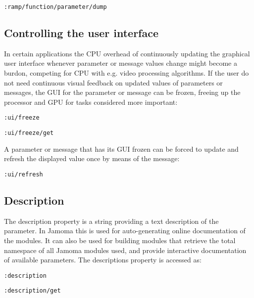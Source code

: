 \documentclass{sig-alternate}
\begin{document}
\texttt{:ramp/function/parameter/dump}





\subsection{Controlling the user interface} %
\label{sub:controlling_the_user_interface}

In certain applications the CPU overhead of continuously updating the graphical user interface whenever parameter or message values change might become a burdon, competing for CPU with e.g. video processing algorithms. If the user do not need continuous visual feedback on updated values of parameters or messages, the GUI for the parameter or message can be frozen, freeing up the processor and GPU for tasks considered more important:

\texttt{:ui/freeze}

\texttt{:ui/freeze/get}

A parameter or message that has its GUI frozen can be forced to update and refresh the displayed value once by means of the message:

\texttt{:ui/refresh}






\subsection{Description} %
\label{sub:description}

The description property is a string providing a text description of the parameter. In Jamoma this is used for auto-generating online documentation of the modules. It can also be used for building modules that retrieve the total namespace of all Jamoma modules used, and provide interactive documentation of available parameters. The descriptions property is accessed as:

\texttt{:description}

\texttt{:description/get}

\end{document}
